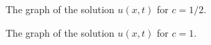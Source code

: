 \documentclass[12pt]{article} %
\begin{document}
\begin{solution}
\begin{enumerate}[(a)]
                \begin{figure}[H]
                	\centering
                	\def\svgwidth{0.6\columnwidth}
                	
                    \caption{The graph of the solution $u(x,t)$ for $c=1/2$.}
                \end{figure}
                \begin{figure}[H]
                                	\centering
                                	\def\svgwidth{0.6\columnwidth}
                                	
                                    \caption{The graph of the solution $u(x,t)$ for $c=1$.}
                                \end{figure}
\end{enumerate}
\end{solution}
\end{document}
